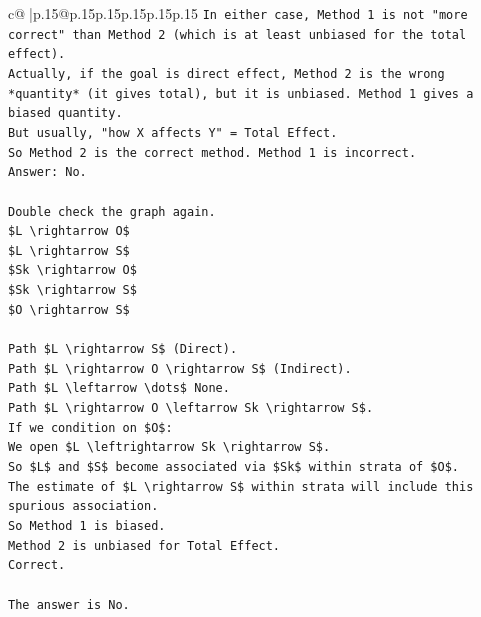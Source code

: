 \documentclass{article}
\begin{document}
{\begin{supertabular}{c@{$\;$}|p{.15\linewidth}@{}p{.15\linewidth}p{.15\linewidth}p{.15\linewidth}p{.15\linewidth}p{.15\linewidth}}
{{{\texttt{In either case, Method 1 is not "more correct" than Method 2 (which is at least unbiased for the total effect).} \\
\texttt{Actually, if the goal is direct effect, Method 2 is the wrong *quantity* (it gives total), but it is unbiased. Method 1 gives a biased quantity.} \\
\texttt{But usually, "how X affects Y" = Total Effect.} \\
\texttt{So Method 2 is the correct method. Method 1 is incorrect.} \\
\texttt{Answer: No.} \\
\\ 
\texttt{Double check the graph again.} \\
\texttt{\$L \textbackslash{}rightarrow O\$} \\
\texttt{\$L \textbackslash{}rightarrow S\$} \\
\texttt{\$Sk \textbackslash{}rightarrow O\$} \\
\texttt{\$Sk \textbackslash{}rightarrow S\$} \\
\texttt{\$O \textbackslash{}rightarrow S\$} \\
\\ 
\texttt{Path \$L \textbackslash{}rightarrow S\$ (Direct).} \\
\texttt{Path \$L \textbackslash{}rightarrow O \textbackslash{}rightarrow S\$ (Indirect).} \\
\texttt{Path \$L \textbackslash{}leftarrow \textbackslash{}dots\$ None.} \\
\texttt{Path \$L \textbackslash{}rightarrow O \textbackslash{}leftarrow Sk \textbackslash{}rightarrow S\$.} \\
\texttt{If we condition on \$O\$:} \\
\texttt{We open \$L \textbackslash{}leftrightarrow Sk \textbackslash{}rightarrow S\$.} \\
\texttt{So \$L\$ and \$S\$ become associated via \$Sk\$ within strata of \$O\$.} \\
\texttt{The estimate of \$L \textbackslash{}rightarrow S\$ within strata will include this spurious association.} \\
\texttt{So Method 1 is biased.} \\
\texttt{Method 2 is unbiased for Total Effect.} \\
\texttt{Correct.} \\
\\ 
\texttt{The answer is No.} \\
\\ 
}}}
\end{supertabular}}
\end{document}
